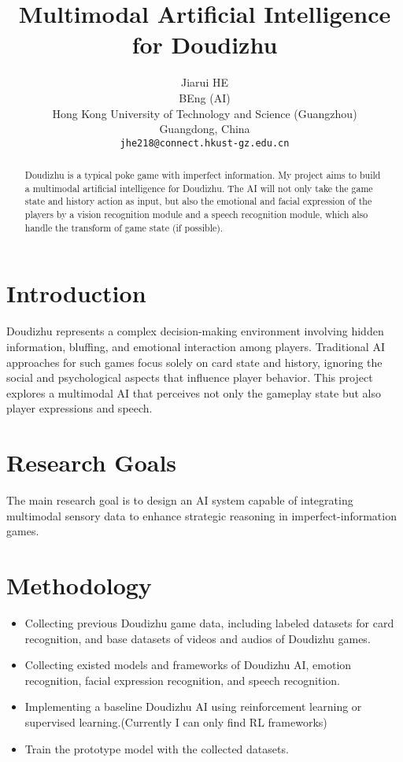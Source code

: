 \documentclass{article}
\title{Multimodal Artificial Intelligence for Doudizhu}
\author{%
    Jiarui HE \\
    BEng (AI) \\
    Hong Kong University of Technology and Science (Guangzhou) \\
    Guangdong, China \\
    \texttt{jhe218@connect.hkust-gz.edu.cn} \\
}
\begin{document}
\maketitle


\begin{abstract}
Doudizhu is a typical poke game with imperfect information. My project aims to build a multimodal artificial intelligence for Doudizhu. The AI will not only take the game state and history action as input, but also the emotional and facial expression of the players by a vision recognition module and a speech recognition module, which also handle the transform of game state (if possible).
\end{abstract}

\section*{Introduction}
Doudizhu represents a complex decision-making environment involving hidden information, bluffing, and emotional interaction among players. Traditional AI approaches for such games focus solely on card state and history, ignoring the social and psychological aspects that influence player behavior. This project explores a multimodal AI that perceives not only the gameplay state but also player expressions and speech.

\section{Research Goals}

The main research goal is to design an AI system capable of integrating multimodal sensory data to enhance strategic reasoning in imperfect-information games.  

\section{Methodology}
\begin{itemize}
    \item Collecting previous Doudizhu game data, including labeled datasets for card recognition, and base datasets of videos and audios of Doudizhu games.
    \item Collecting existed models and frameworks of Doudizhu AI, emotion recognition, facial expression recognition, and speech recognition.
    \item Implementing a baseline Doudizhu AI using reinforcement learning or supervised learning.(Currently I can only find RL frameworks)
    \item Train the prototype model with the collected datasets.
\end{itemize}
\end{document}

